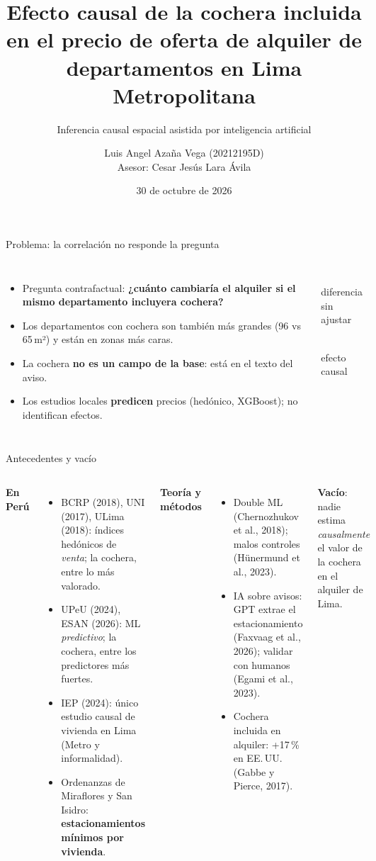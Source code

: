 \documentclass[aspectratio=169,11pt]{beamer}
\title{Efecto causal de la cochera incluida en el precio de oferta de alquiler de departamentos en Lima Metropolitana}
\subtitle{Inferencia causal espacial asistida por inteligencia artificial}
\author{Luis Angel Azaña Vega (20212195D)\\[2pt]{\small Asesor: Cesar Jesús Lara Ávila}}
\institute{Universidad Nacional de Ingeniería · Facultad de Ciencias\\Escuela Profesional de Ciencia de la Computación}
\date{30 de octubre de 2026}
\newcommand{\dato}[2]{\begin{minipage}[t]{0.42\linewidth}\centering{\Huge\bfseries\color{azul}#1}\\[2pt]{\small #2}\end{minipage}}
\begin{document}
\begin{frame}
\titlepage
\end{frame}

\begin{frame}{Problema: la correlación no responde la pregunta}
\begin{columns}[T]
\begin{itemize}
\item Pregunta contrafactual: \textbf{¿cuánto cambiaría el alquiler si el mismo departamento incluyera cochera?}
\item Los departamentos con cochera son también más grandes (96 vs 65\,m²) y están en zonas más caras.
\item La cochera \textbf{no es un campo de la base}: está en el texto del aviso.
\item Los estudios locales \textbf{predicen} precios (hedónico, XGBoost); no identifican efectos.
\end{itemize}
\vspace{0.8cm}
\begin{center}
\dato{+63\%}{diferencia\\sin ajustar}\hspace{0.5em}\dato{?}{efecto\\causal}
\end{center}
\end{columns}
\end{frame}

\begin{frame}{Antecedentes y vacío}
\begin{columns}[T]
\small
\textbf{En Perú}
\begin{itemize}
\item BCRP (2018), UNI (2017), ULima (2018): índices hedónicos de \emph{venta}; la cochera, entre lo más valorado.
\item UPeU (2024), ESAN (2026): ML \emph{predictivo}; la cochera, entre los predictores más fuertes.
\item IEP (2024): único estudio causal de vivienda en Lima (Metro y informalidad).
\item Ordenanzas de Miraflores y San Isidro: \textbf{estacionamientos mínimos por vivienda}.
\end{itemize}
\small
\textbf{Teoría y métodos}
\begin{itemize}
\item Double ML (Chernozhukov et al., 2018); malos controles (Hünermund et al., 2023).
\item IA sobre avisos: GPT extrae el estacionamiento (Faxvaag et al., 2026); validar con humanos (Egami et al., 2023).
\item Cochera incluida en alquiler: +17\,\% en EE.\,UU. (Gabbe y Pierce, 2017).
\end{itemize}
\vspace{0.2cm}
\textbf{Vacío}: nadie estima \emph{causalmente} el valor de la cochera en el alquiler de Lima.
\end{columns}
\end{frame}
\end{document}

